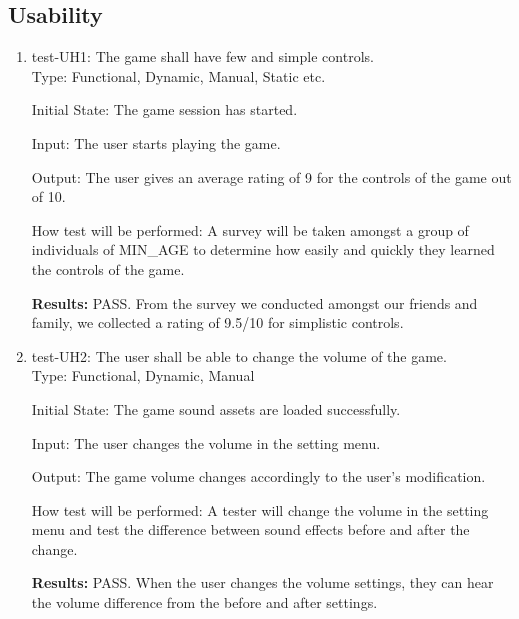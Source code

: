 \documentclass[12pt, titlepage]{article}
\begin{document}
\subsection{Usability}
\begin{enumerate}
\item {test-UH1: The game shall have few and simple controls.\\}
Type: Functional, Dynamic, Manual, Static etc.
					
Initial State: The game session has started.
					
Input: The user starts playing the game.
					
Output: The user gives an average rating of 9 for the controls of the game out of 10.
					
How test will be performed: A survey will be taken amongst a group of individuals of MIN\_AGE to determine how easily and quickly they learned the controls of the game. 

\textbf{Results:} PASS. From the survey we conducted amongst our friends and family, we collected a rating of 9.5/10 for simplistic controls.


\item {test-UH2: The user shall be able to change the volume of the game.\\}
Type: Functional, Dynamic, Manual
					
Initial State: The game sound assets are loaded successfully.

Input: The user changes the volume in the setting menu.
					
Output: The game volume changes accordingly to the user's modification.
					
How test will be performed: A tester will change the volume in the setting menu and test the difference between sound effects before and after the change.

\textbf{Results:} PASS. When the user changes the volume settings, they can hear the volume difference from the before and after settings.

\end{enumerate}
\end{document}
